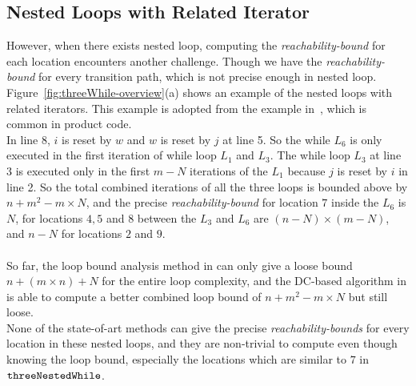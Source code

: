 \subsection{Nested Loops with Related Iterator}
\label{sec:overview-nestedwhile}
However, when there exists nested loop, computing the \emph{reachability-bound} for each location encounters another challenge.
Though we have
the \emph{reachability-bound} for every transition path, which is not precise enough in nested loop.
Figure~\ref{fig:threeWhile-overview}(a) shows an example of the nested loops with related 
iterators.
This example is adopted from the example in~\cite{GulwaniJK09}, which is common in product code.
\\
In line 8, $i$ is reset by $w$ and $w$ is reset by $j$ at line 5. So the
while $L_6$ is only executed in the first iteration of while loop $L_1$ and $L_3$.
The while loop $L_3$ at line 3 is executed only in 
the first $m - N$ iterations of the 
$L_1$ because $j$ is reset by $i$ in line 2.
So the total combined iterations of all the three loops is bounded above by 
$n + m^2 - m \times N$,
and the precise \emph{reachability-bound} for location $7$ inside the $L_6$ is $N$,
for locations $4, 5$ and $8$ between the $L_3$ and $L_6$ are $(n-N) \times (m - N)$,
and $n - N$ for locations $2$ and $9$.
\\
\\
So far, the loop bound analysis method in \cite{GulwaniJK09} can only give a loose bound $n + (m \times n) + N$ for the entire loop complexity, and 
the DC-based algorithm in \cite{sinn2017complexity} is able to
compute a better combined loop bound of $n + m^2 - m \times N$ but still loose.
\\
None of the state-of-art methods can give the precise \emph{reachability-bounds} for every location in these nested loops,
and they are non-trivial to compute even though knowing the loop bound,
especially the locations which are similar to $7$ in $\mathtt{threeNestedWhile}$.
\\
